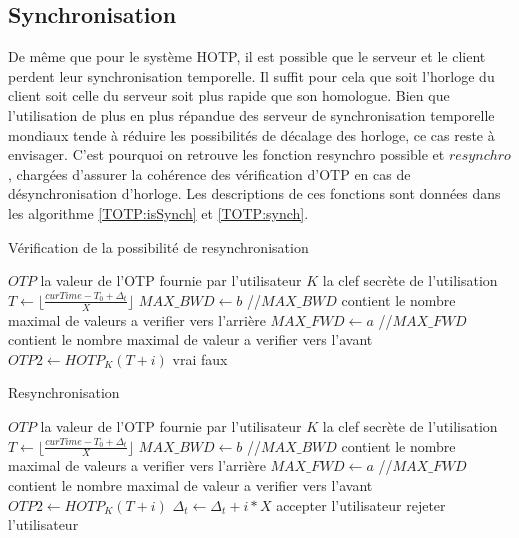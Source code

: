 \documentclass{../res/univ-projet}
\begin{document}
  \subsection{Synchronisation}
  \label{OTP:syncSec}
    De m\^eme que pour le système \og{}HOTP\fg{}, il est possible que le serveur et le client perdent leur synchronisation temporelle. Il suffit pour cela que soit 
    l'horloge du client soit celle du serveur soit plus rapide que son homologue. Bien que l'utilisation de plus en plus répandue des serveur de synchronisation 
    temporelle mondiaux tende à réduire les possibilités de décalage des horloge, ce cas reste à envisager. C'est pourquoi on retrouve les fonction \og{}resynchro 
    possible\fg{} et $resynchro$, chargées d'assurer la cohérence des vérification d'OTP en cas de désynchronisation d'horloge. Les descriptions de ces fonctions sont 
    données dans les algorithme \ref{TOTP:isSynch} et \ref{TOTP:synch}.
    \begin{algorithm}
      \caption{Vérification de la possibilité de resynchronisation}
      \label{TOTP:isSynch}
      
      \begin{algorithmic}
	\REQUIRE $OTP$ la valeur de l'OTP fournie par l'utilisateur
	\REQUIRE $K$ la clef secrète de l'utilisation
	\STATE $T \leftarrow \lfloor{}\frac{curTime - T_0 + \Delta_t}{X}\rfloor{}$
	\STATE $MAX\_BWD \leftarrow b$ //$MAX\_BWD$ contient le nombre maximal de valeurs a verifier vers l'arrière
	\STATE $MAX\_FWD \leftarrow a$ //$MAX\_FWD$ contient le nombre maximal de valeur a verifier vers l'avant
	  \STATE $OTP2 \leftarrow HOTP_K(T + i)$
	    \RETURN vrai
	  \ENDIF
	\ENDFOR
	\RETURN faux
      \end{algorithmic}
    \end{algorithm}
    
    \begin{algorithm}
      \caption{Resynchronisation}
      \label{TOTP:synch}
      
      \begin{algorithmic}
	\REQUIRE $OTP$ la valeur de l'OTP fournie par l'utilisateur
	\REQUIRE $K$ la clef secrète de l'utilisation
	\STATE $T \leftarrow \lfloor{}\frac{curTime - T_0 + \Delta_t}{X}\rfloor{}$
	\STATE $MAX\_BWD \leftarrow b$ //$MAX\_BWD$ contient le nombre maximal de valeurs a verifier vers l'arrière
	\STATE $MAX\_FWD \leftarrow a$ //$MAX\_FWD$ contient le nombre maximal de valeur a verifier vers l'avant
	  \STATE $OTP2 \leftarrow HOTP_K(T + i)$
	    \STATE $\Delta_t \leftarrow \Delta_t + i * X$
	    \STATE accepter l'utilisateur
	  \ENDIF
	\ENDFOR
	\STATE rejeter l'utilisateur
      \end{algorithmic}
    \end{algorithm}
    
\end{document}
